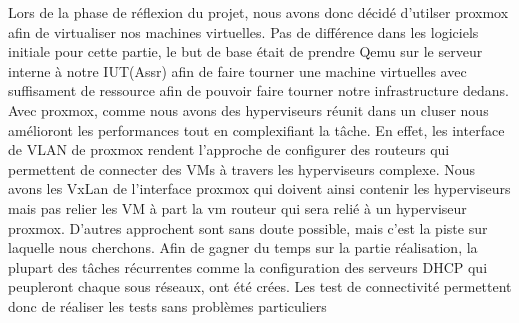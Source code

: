 \documentclass[../file.tex]{subfiles}
\begin{document}
	
Lors de la phase de réflexion du projet, nous avons donc décidé d'utilser proxmox afin de virtualiser
nos machines virtuelles. Pas de différence dans les logiciels initiale pour cette partie, le but de base 
était de prendre Qemu sur le serveur interne à notre IUT(Assr) afin de faire tourner une machine virtuelles
avec suffisament de ressource afin de pouvoir faire tourner notre infrastructure dedans.
Avec proxmox, comme nous avons des hyperviseurs réunit dans un cluser nous amélioront les performances tout en 
complexifiant la tâche. En effet, les interface de VLAN de proxmox rendent l'approche de configurer des routeurs 
qui permettent de connecter des VMs à travers les hyperviseurs complexe. Nous avons les VxLan de l'interface proxmox 
qui doivent ainsi contenir les hyperviseurs mais pas relier les VM à part la vm routeur qui sera relié à un hyperviseur proxmox.
D'autres approchent sont sans doute possible, mais c'est la piste sur laquelle nous cherchons.
Afin de gagner du temps sur la partie réalisation, la plupart des tâches récurrentes comme la configuration des serveurs 
DHCP qui peupleront chaque sous réseaux, ont été crées. Les test de connectivité permettent donc de réaliser les tests sans problèmes
particuliers
\end{document}
